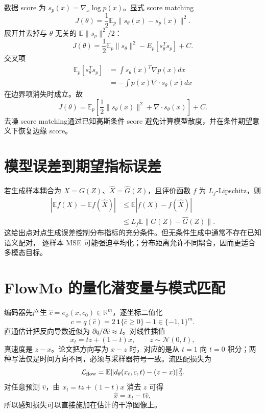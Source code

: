 \documentclass[11pt]{article}
\numberwithin{equation}{section}
\newcommand{\R}{\mathbb{R}}
\newcommand{\E}{\mathbb{E}}
\newcommand{\1}{\mathbf{1}}
\newcommand{\cN}{\mathcal{N}}
\newcommand{\cL}{\mathcal{L}}
\begin{document}
数据 score 为 $s_p(x)=\nabla_x\log p(x)$。显式 score matching
\begin{equation}
 J(\theta)=\frac12\E_p\|s_\theta(x)-s_p(x)\|^2.
\end{equation}
展开并去掉与 $\theta$ 无关的 $\E\|s_p\|^2/2$：
\begin{equation}
 J(\theta)=\frac12\E_p\|s_\theta\|^2-E_p[s_\theta^Ts_p]+C.
\end{equation}
交叉项
\begin{align}
 \E_p[s_\theta^Ts_p]
 &=\int s_\theta(x)^T\nabla p(x)dx\\
 &=-\int p(x)\nabla\cdot s_\theta(x)dx
\end{align}
在边界项消失时成立。故
\begin{equation}
 J(\theta)=\E_p\left[
 \frac12\|s_\theta(x)\|^2+\nabla\cdot s_\theta(x)
 \right]+C.
\end{equation}
去噪 score matching通过已知高斯条件 score 避免计算模型散度，并在条件期望意义下恢复边缘 score。

\section{模型误差到期望指标误差}

若生成样本耦合为 $X=G(Z)$、$\widehat X=\widehat G(Z)$，且评价函数
$f$ 为 $L_f$-Lipschitz，则
\begin{align}
 |\E f(X)-\E f(\widehat X)|
 &\le\E|f(X)-f(\widehat X)|\\
 &\le L_f\E\|G(Z)-\widehat G(Z)\|.
\end{align}
这给出点对点生成误差控制分布指标的充分条件。但无条件生成中通常不存在已知语义配对，
逐样本 MSE 可能强迫平均化；分布距离允许不同耦合，因而更适合多模态目标。

\section{FlowMo 的量化潜变量与模式匹配}
编码器先产生 $\hat c=e_\phi(x,c_0)\in\R^m$，逐坐标二值化
\begin{equation}
  c=q(\hat c)=2\,\1\{\hat c\ge0\}-1\in\{-1,1\}^m.
\end{equation}
直通估计把反向导数近似为 $\partial q/\partial\hat c\approx I$。对线性插值
\begin{equation}
  x_t=t z+(1-t)x,\qquad z\sim\cN(0,I),
\end{equation}
真速度是 $z-x$。论文把方向写为 $x-z$ 时，对应的是从 $t=1$ 向 $t=0$ 积分；两种写法仅是时间方向不同，必须与采样器符号一致。流匹配损失为
\begin{equation}
  \cL_{\rm flow}=\E\|d_\theta(x_t,c,t)-(z-x)\|_2^2.
\end{equation}
对任意预测 $\hat v$，由 $x_t=tz+(1-t)x$ 消去 $z$ 可得
\begin{equation}
  \hat x=x_t-t\hat v,
\end{equation}
所以感知损失可以直接施加在估计的干净图像上。
\end{document}

